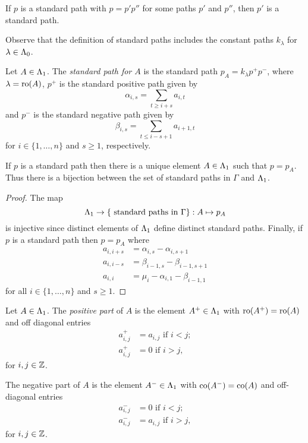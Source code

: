 \documentclass[a4paper, 11pt]{report}
\begin{document}
\begin{remark}
If $p$ is a standard path with $p=p'p''$ for some paths $p'$ and $p''$, then $p'$ is a standard path.
\end{remark}

Observe that the definition of standard paths includes the constant paths $k_\lambda$ for $\lambda\in\Lambda_0{}$.

\begin{definition}\label{def:std-path-for-matrix}
Let $A\in\Lambda_1{}$. The \emph{standard path for $A$} is the standard path $p_A=k_\lambda p^+ p^-$, where $\lambda=\operatorname{ro}(A)$, $p^+$ is the standard positive path given by
\begin{equation*}
\alpha_{i,s} = \sum_{t\geq i+s} a_{i,t}
\end{equation*}
and $p^-$ is the standard negative path given by
\begin{equation*}
\beta_{i,s} = \sum_{t\le i-s+1} a_{i+1,t}
\end{equation*}
for $i\in\{1,\ldots,n\}$ and $s\geq 1$, respectively.
\end{definition}

\begin{lemma}\label{lemma:correspondence-std-paths-to-basis}
If $p$ is a standard path then there is a unique element $A\in\Lambda_1{}$ such that $p=p_A$. Thus there is a bijection between the set of standard paths in $\Gamma$ and $\Lambda_1{}$.
\end{lemma}

\begin{proof}
The map
\begin{equation*}
\Lambda_1{}\to \{\text{ standard paths in }\Gamma\}:A\mapsto p_A
\end{equation*}
is injective since distinct elements of $\Lambda_1{}$ define distinct standard paths. Finally, if $p$ is a standard path then $p=p_A$ where
\begin{align*}
a_{i,i+s} &= \alpha_{i,s}-\alpha_{i,s+1}\\
a_{i,i-s} &= \beta_{i-1,s}-\beta_{i-1,s+1}\\
a_{i,i} &= \mu_i - \alpha_{i,1} -\beta_{i-1,1}
\end{align*}
for all $i\in\{1,\ldots,n\}$ and $s\geq 1$.
\end{proof}

\begin{definition}\label{def:matrix-pos-neg-parts}
Let $A\in\Lambda_1{}$. The \emph{positive part} of $A$ is the element $A^+\in\Lambda_1{}$ with $\operatorname{ro}(A^+)=\operatorname{ro}(A)$ and off diagonal entries
\begin{align*}
a_{i,j}^+ &= a_{i,j} \text{ if } i<j;\\
a_{i,j}^+ &= 0 \text{ if } i>j,
\end{align*}
for $i,j\in\mathbb{Z}$.

The negative part of $A$ is the element $A^-\in\Lambda_1{}$ with $\operatorname{co}(A^-)=\operatorname{co}(A)$ and off-diagonal entries
\begin{align*}
a_{i,j}^- &= 0 \text{ if } i<j;\\
a_{i,j}^- &= a_{i,j} \text{ if } i>j,
\end{align*}
for $i,j\in\mathbb{Z}$.
\end{definition}
\end{document}
